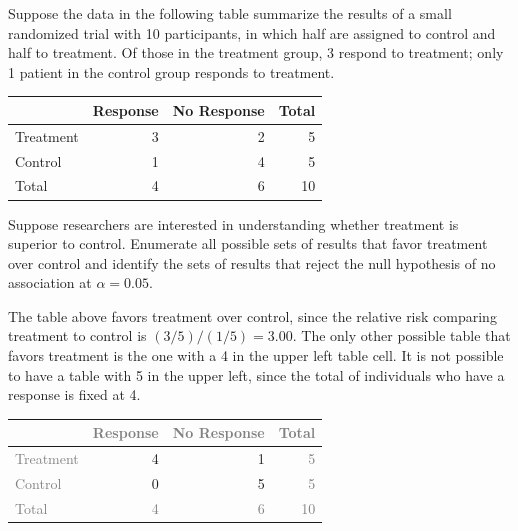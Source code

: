 \begin{examplewrap}
	\begin{nexample}{Suppose the data in the following table summarize the results of a small randomized trial with 10 participants, in which half are assigned to control and half to treatment. Of those in the treatment group, 3 respond to treatment; only 1 patient in the control group responds to treatment.
			\vspace{0.2cm}
			
			\centering
			\begin{tabular}{l rr |r}
				\hline
				 & Response & No Response & Total \\
				\hline
				Treatment &  3 & 2 & 5    \\
				Control & 1 & 4 &  5    \\
				\hline
				Total & 4 & 6 & 10 \\
				\hline
			\end{tabular}
			\flushleft
			
			\vspace{0.1cm}
			
			Suppose researchers are interested in understanding whether treatment is superior to control. Enumerate all possible sets of results that favor treatment over control and identify the sets of results that reject the null hypothesis of no association at $\alpha = 0.05$.}\label{ex:fisherTestSmallSample} 
		

		
		The table above favors treatment over control, since the relative risk comparing treatment to control is $(3/5)/(1/5) = 3.00$. The only other possible table that favors treatment is the one with a 4 in the upper left table cell. It is not possible to have a table with 5 in the upper left, since the total of individuals who have a response is fixed at 4.
		
		\centering
		\begin{tabular}{l rr |r}
			\hline
			& \textcolor{gray}{Response} & \textcolor{gray}{No Response} & \textcolor{gray}{Total} \\
			\hline
			\textcolor{gray}{Treatment} &  4 & 1 & \textcolor{gray}{5}    \\
			\textcolor{gray}{Control} & 0 & 5 &  \textcolor{gray}{5}    \\
			\hline
			\textcolor{gray}{Total} & \textcolor{gray}{4} & \textcolor{gray}{6} & \textcolor{gray}{10} \\
			\hline
		\end{tabular}
		\flushleft
		

\end{nexample}
\end{examplewrap}
